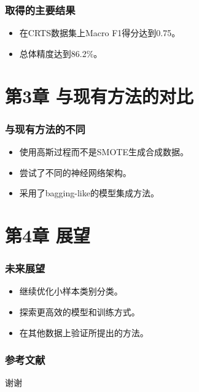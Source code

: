 \documentclass[10pt]{ctexbeamer}
\begin{document}
\begin{frame}[t]
  \frametitle{取得的主要结果}
  \begin{itemize}
    \item 在CRTS数据集上Macro F1得分达到0.75。
    \item 总体精度达到86.2\%。
  \end{itemize}
\end{frame}

\section{第3章 与现有方法的对比}\label{sec:3}

\begin{frame}[t]
  \frametitle{与现有方法的不同}
  \begin{itemize}
    \item 使用高斯过程而不是SMOTE生成合成数据。
    \item 尝试了不同的神经网络架构。
    \item 采用了bagging-like的模型集成方法。
  \end{itemize}
\end{frame}

\section{第4章 展望}\label{sec:4}



\begin{frame}[t]
  \frametitle{未来展望}
  \begin{itemize}
    \item 继续优化小样本类别分类。
    \item 探索更高效的模型和训练方式。
    \item 在其他数据上验证所提出的方法。
  \end{itemize}
\end{frame}




\begin{frame}
  \frametitle{参考文献}
  \nocite{*}%
  \printbibliography%
\end{frame}

\begin{frame}[plain]
  \vfill
  \centerline{\Huge 谢谢}
  \vfill
\end{frame}

%  
\end{document}
